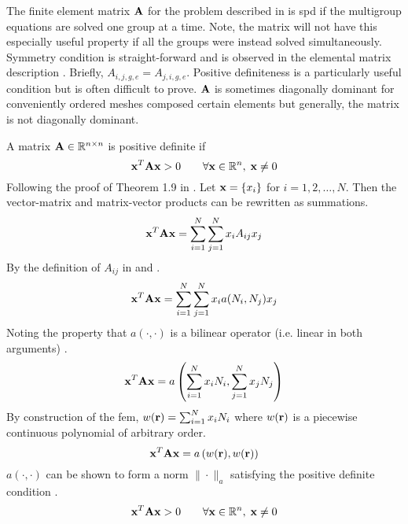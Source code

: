     The finite element matrix $\mathbf{A}$ for the problem described in 
     is \gls{spd} if the
    multigroup equations are solved one group at a time. Note, the matrix will
    not have this especially useful property if all the groups were instead 
    solved simultaneously. Symmetry condition is straight-forward and is 
    observed in the elemental matrix description . 
    Briefly, ${A_{i,j,g,e}=A_{j,i,g,e}}$.
    Positive definiteness is a particularly useful condition but is often 
    difficult to prove. $\mathbf{A}$ is sometimes diagonally dominant for conveniently
    ordered meshes composed certain elements but generally, the matrix is not 
    diagonally dominant. 
    
    A matrix $\mathbf{A} \in \mathbb{R}^{n \times n}$ is positive definite if
    \begin{equation} \label{eq:positive_definite}
      \mathbf{x}^{T} \mathbf{A} \mathbf{x} > 0 \qquad \forall \mathbf{x} \in \mathbb{R}^{n}, \; \mathbf{x} \ne 0
    \end{equation}
    Following the proof of Theorem 1.9 in \cite{textbookhughes}. Let 
    $\mathbf{x} = \{x_i\}$ for $i = 1,2,\ldots,N$. Then the vector-matrix and 
    matrix-vector products can be rewritten as summations.
    \begin{equation}
      \mathbf{x}^{T} \mathbf{A} \mathbf{x} = \sum_{i=1}^{N} \sum_{j=1}^{N} x_i A_{ij} x_j
    \end{equation}
    By the definition of $A_{ij}$ in  and 
    .
    \begin{equation}
      \mathbf{x}^{T} \mathbf{A} \mathbf{x} = 
        \sum_{i=1}^{N} \sum_{j=1}^{N} x_i a(N_i,N_j) x_j
    \end{equation}
    Noting the property that $a(\cdot,\cdot)$ is a bilinear operator (i.e.
    linear in both arguments) \cite{textbookli}.
    \begin{equation}
      \mathbf{x}^{T} \mathbf{A} \mathbf{x} =
        a \left( \sum_{i=1}^{N} x_i N_i, \sum_{j=1}^{N} x_j N_j 
        \right)
    \end{equation}
    By construction of the \gls{fem}, $w(\mathbf{r}) = \sum_{i=1}^{N} x_i N_i$ 
    where $w(\mathbf{r})$ is a piecewise continuous polynomial of arbitrary order.
    \begin{equation}
      \mathbf{x}^{T} \mathbf{A} \mathbf{x} = a \left(w(\mathbf{r}),w(\mathbf{r})\right)
    \end{equation}
    $a(\cdot,\cdot)$ can be shown to form a norm $\|\cdot \|_a$
    \cite{textbookli} satisfying the positive definite condition
    .
    \begin{equation}
      \mathbf{x}^{T} \mathbf{A} \mathbf{x} > 0 \qquad \forall \mathbf{x} \in \mathbb{R}^{n}, \; \mathbf{x} \ne 0
    \end{equation}
    

